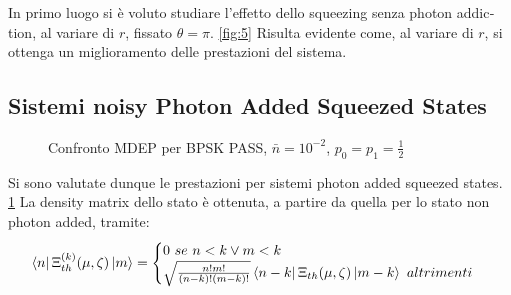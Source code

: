 \documentclass[a4paper,11pt]{article}
\begin{document}
    In primo luogo si è voluto studiare l'effetto dello \foreignlanguage{english}
    {squeezing} senza \foreignlanguage{english}{photon addiction}, al variare di $r$, fissato 
    $\theta=\pi$. \ref{fig:5}
    Risulta evidente come, al variare di $r$, si ottenga un miglioramento delle prestazioni del sistema.

    \subsection{Sistemi \foreignlanguage{english}{noisy Photon Added Squeezed States}}
    \begin{figure}[ht]
        \caption{Confronto MDEP per BPSK PASS, $\bar{n}=10^{-2}$, $p_0=p_1=\frac{1}{2}$}
        \label{fig:6}
    \end{figure}
    Si sono valutate dunque le prestazioni per sistemi \foreignlanguage{english}
    {photon added squeezed states}. \ref{fig:6}
    La \foreignlanguage{english}{density matrix} dello stato è ottenuta, a partire da quella per lo
    stato non \foreignlanguage{english}{photon added}, tramite:
    \begin{equation}
        \bra{n}\Xi_{th}^{(k)}(\mu,\zeta)\ket{m}=
            \begin{cases}
                0\ se\ n<k \lor m<k\\
                \sqrt{\frac{n!m!}{(n-k)!(m-k)!}}\bra{n-k}\Xi_{th}(\mu,\zeta)\ket{m-k}\ altrimenti
            \end{cases}
    \end{equation}
\end{document}

